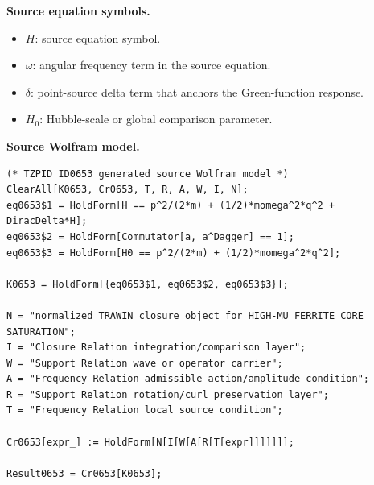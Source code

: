 \begin{minipage}[t]{0.49\linewidth}
\begingroup
\small
\raggedright
\textbf{Source equation symbols.}\par
\begin{itemize}[leftmargin=1.35em,itemsep=1pt,topsep=1pt,parsep=0pt]
    \item $H$: source equation symbol.
    \item $\omega$: angular frequency term in the source equation.
    \item $\delta$: point-source delta term that anchors the Green-function response.
    \item $H_0$: Hubble-scale or global comparison parameter.
\end{itemize}
\endgroup
\end{minipage}\hfill
\begin{minipage}[t]{0.47\linewidth}
\begingroup
\scriptsize
\raggedright
\textbf{Source Wolfram model.}\par
\begin{Verbatim}[fontsize=\tiny,breaklines=true,breakanywhere=true]
(* TZPID ID0653 generated source Wolfram model *)
ClearAll[K0653, Cr0653, T, R, A, W, I, N];
eq0653$1 = HoldForm[H == p^2/(2*m) + (1/2)*momega^2*q^2 + DiracDelta*H];
eq0653$2 = HoldForm[Commutator[a, a^Dagger] == 1];
eq0653$3 = HoldForm[H0 == p^2/(2*m) + (1/2)*momega^2*q^2];

K0653 = HoldForm[{eq0653$1, eq0653$2, eq0653$3}];

N = "normalized TRAWIN closure object for HIGH-MU FERRITE CORE SATURATION";
I = "Closure Relation integration/comparison layer";
W = "Support Relation wave or operator carrier";
A = "Frequency Relation admissible action/amplitude condition";
R = "Support Relation rotation/curl preservation layer";
T = "Frequency Relation local source condition";

Cr0653[expr_] := HoldForm[N[I[W[A[R[T[expr]]]]]]];

Result0653 = Cr0653[K0653];
\end{Verbatim}
\endgroup
\end{minipage}

